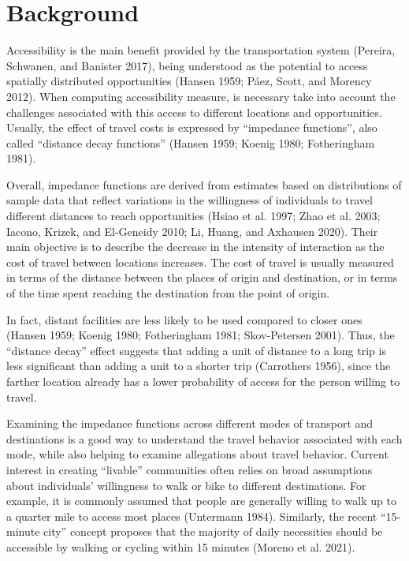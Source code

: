 \documentclass[preprint, 3p,
authoryear]{elsarticle} %
\begin{document}
\hypertarget{background}{%
\section{Background}\label{background}}

Accessibility is the main benefit provided by the transportation system
(Pereira, Schwanen, and Banister 2017), being understood as the
potential to access spatially distributed opportunities (Hansen 1959;
Páez, Scott, and Morency 2012). When computing accessibility measure, is
necessary take into account the challenges associated with this access
to different locations and opportunities. Usually, the effect of travel
costs is expressed by ``impedance functions'', also called ``distance
decay functions'' (Hansen 1959; Koenig 1980; Fotheringham 1981).

Overall, impedance functions are derived from estimates based on
distributions of sample data that reflect variations in the willingness
of individuals to travel different distances to reach opportunities
(Hsiao et al. 1997; Zhao et al. 2003; Iacono, Krizek, and El-Geneidy
2010; Li, Huang, and Axhausen 2020). Their main objective is to describe
the decrease in the intensity of interaction as the cost of travel
between locations increases. The cost of travel is usually measured in
terms of the distance between the places of origin and destination, or
in terms of the time spent reaching the destination from the point of
origin.

In fact, distant facilities are less likely to be used compared to
closer ones (Hansen 1959; Koenig 1980; Fotheringham 1981; Skov-Petersen
2001). Thus, the ``distance decay'' effect suggests that adding a unit
of distance to a long trip is less significant than adding a unit to a
shorter trip (Carrothers 1956), since the farther location already has a
lower probability of access for the person willing to travel.

Examining the impedance functions across different modes of transport
and destinations is a good way to understand the travel behavior
associated with each mode, while also helping to examine allegations
about travel behavior. Current interest in creating ``livable''
communities often relies on broad assumptions about individuals'
willingness to walk or bike to different destinations. For example, it
is commonly assumed that people are generally willing to walk up to a
quarter mile to access most places (Untermann 1984). Similarly, the
recent ``15-minute city'' concept proposes that the majority of daily
necessities should be accessible by walking or cycling within 15 minutes
(Moreno et al. 2021).
\end{document}
